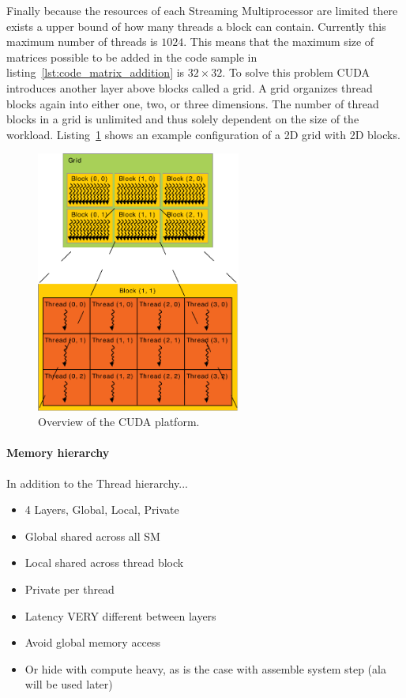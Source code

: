 \documentclass[a4paper,11pt]{kth-mag}
\begin{document}
Finally because the resources of each Streaming Multiprocessor are limited there exists a upper bound of how many threads a block can contain. Currently this maximum number of threads is $1024$. This means that the maximum size of matrices possible to be added in the code sample in listing~\ref{lst:code_matrix_addition} is $32\times32$. To solve this problem CUDA introduces another layer above blocks called a grid. A grid organizes thread blocks again into either one, two, or three dimensions. The number of thread blocks in a grid is unlimited and thus solely dependent on the size of the workload. Listing~\ref{fig:grid_blocks} shows an example configuration of a 2D grid with 2D blocks.

\begin{figure}[!htbp]
  \centering
  \includegraphics[width=0.6\textwidth]{img/grid_blocks.pdf}
  \caption{Overview of the CUDA platform.}
  \label{fig:grid_blocks}
\end{figure}

\paragraph{Memory hierarchy}

In addition to the Thread hierarchy...

\begin{itemize}
\item 4 Layers, Global, Local, Private
\item Global shared across all SM
\item Local shared across thread block
\item Private per thread
\item Latency VERY different between layers
\item Avoid global memory access
\item Or hide with compute heavy, as is the case with assemble system step (ala will be used later)
\end{itemize}
\end{document}

